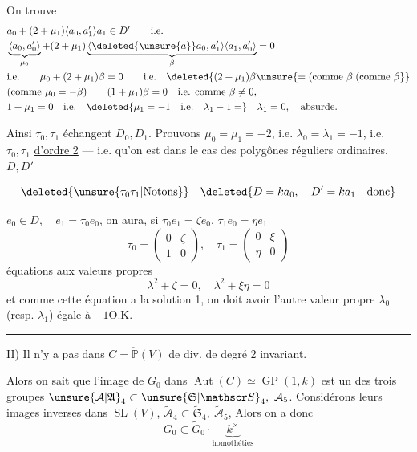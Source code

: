On trouve
\[
\begin{aligned}
&a_0+(2+\mu_1)\langle a_0,a'_1\rangle a_1\in D'\qquad\text{i.e.}\\
&\underbrace{\langle a_0,a'_0\rangle}_{\mu_0}+
(2+\mu_1)\underbrace{\langle\deleted{\unsure{a}}a_0,a'_1\rangle
\langle a_1,a'_0\rangle}_{\beta}=0\\
&\text{i.e.}\qquad \mu_0+(2+\mu_1)\beta=0\qquad\text{i.e.}\quad
\deleted{(2+\mu_1)\beta\unsure{=(\text{comme }\beta|(\text{comme }\beta}}\\
&(\text{comme }\mu_0=-\beta)\qquad(1+\mu_1)\beta=0\quad\text{i.e. comme }\beta\ne0,\\
&1+\mu_1=0\quad\text{i.e.}\quad
\deleted{\mu_1=-1\quad\text{i.e.}\quad\lambda_1-1=}\quad
\lambda_1=0,\quad\text{absurde.}
\end{aligned}
\]

Ainsi $\tau_0,\tau_1$ échangent $D_0,D_1$. Prouvons   $\mu_0=\mu_1=-2$, i.e. $\lambda_0=\lambda_1=-1$, i.e. $\tau_0,\tau_1$ \uline{d'ordre 2} --- i.e. qu'on est dans le cas des polygônes réguliers ordinaires.   $D,D'$

\[
\deleted{\unsure{\tau_0\tau_1|\text{Notons}}}\quad
\deleted{D=ka_0,\quad D'=ka_1\quad\text{donc}}
\]

$e_0\in D,\quad e_1=\tau_0e_0$, on aura, si $\tau_0e_1=\zeta e_0$, $\tau_1e_0=\eta e_1$ 
\[
\tau_0=\begin{pmatrix}0&\zeta\\1&0\end{pmatrix},\quad
\tau_1=\begin{pmatrix}0&\xi\\\eta&0\end{pmatrix}
\]
équations aux valeurs propres
\[
\lambda^2+\zeta=0,\quad\lambda^2+\xi\eta=0
\]
et comme cette équation a la  solution 1, on doit avoir l'autre valeur propre $\lambda_0$ (resp. $\lambda_1$) égale à $-1$\quad O.K.

\begin{center}\rule{1.1cm}{0.3pt}\end{center}

II) Il n'y a pas dans $C=\check{\mathbb P}(V)$ de div. de degré 2 invariant.

Alors on sait que l'image de $G_{0}$ dans $\operatorname{Aut}(C)\simeq \operatorname{GP}(1,k)$ est un des trois groupes $\unsure{\mathcal A|\mathfrak A}_4\subset \unsure{\mathfrak S|\mathscr S}_4,\ \mathcal A_5$. Considérons leurs images inverses dans $\operatorname{SL}(V)$, $\widetilde{\mathcal A}_4\subset\widetilde{\mathfrak S}_4,\ \widetilde{\mathcal A}_5$,  Alors on a donc
\[
G_0\subset\widetilde G_0\cdot\underbrace{k^\times}_{\text{homothéties}}
\]
